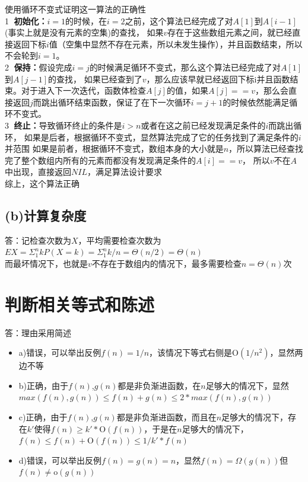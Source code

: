 \documentclass[cn,11pt,chinese]{elegantbook}
\begin{document}
  使用循环不变式证明这一算法的正确性 \\\textcircled{1} \textbf{初始化：}$i=1$的时候，在$i=2$之前，这个算法已经完成了对$A[1]$到$A[i-1]$(事实上就是没有元素的空集)的查找，
  如果$v$存在于这些数组元素之间，就已经直接返回下标$i$值（空集中显然不存在元素，所以未发生操作），并且函数结束，所以不会轮到$i=1$。
\\\textcircled{2} \textbf{保持：}假设完成$i=j$的时候满足循环不变式，那么这个算法已经完成了对$A[1]$到$A[j-1]$的查找，
  如果已经查到了$v$，那么应该早就已经返回下标i并且函数结束。对于进入下一次迭代，函数体检查$A[j]$的值，如果$A[j]==v$，那么会直接返回$j$而跳出循环结束函数，保证了在下一次循环$i=j+1$的时候依然能满足循环不变式。
\\\textcircled{3} \textbf{终止：}导致循环终止的条件是$i>n$或者在这之前已经发现满足条件的$i$而跳出循环，
  如果是后者，根据循环不变式，显然算法完成了它的任务找到了满足条件的$i$并范围
  如果是前者，根据循环不变式，数组本身的大小就是$n$，所以算法已经查找完了整个数组内所有的元素而都没有发现满足条件的$A[i]==v$，
      所以$v$不在$A$中出现，直接返回$NIL$，满足算法设计要求
\\综上，这个算法正确

\subsection{(b)计算复杂度}

答：记检查次数为$X$，平均需要检查次数为$EX = \Sigma_1^n kP(X = k) = \Sigma_1^n k/n = \Theta(n/2) = \Theta(n)$\\
    而最坏情况下，也就是$v$不存在于数组内的情况下，最多需要检查$n=\Theta(n)$次

\section{判断相关等式和陈述}

答：理由采用简述
\begin{itemize}
  \item a)错误，可以举出反例$f(n) = 1/n$，该情况下等式右侧是$\mathrm{O} (1/n^2)$，显然两边不等 
  \item b)正确，由于$f(n)$,$g(n)$都是非负渐进函数，在$n$足够大的情况下，显然$max(f(n),g(n)) \le f(n)+g(n) \le 2*max(f(n),g(n))$
  \item c)正确，由于$f(n)$,$g(n)$都是非负渐进函数，而且在$n$足够大的情况下，存在$k'$使得$f(n) \ge k'*\mathrm{O} (f(n)) $，于是在$n$足够大的情况下，$f(n) \le f(n) + \mathrm{O} (f(n)) \le 1/k' * f(n)$
  \item d)错误，可以举出反例$f(n) = g(n) =n$，显然$f(n) = \Omega (g(n))$但$f(n) \neq  \mathrm{o}(g(n))$
\end{itemize}
\end{document}

